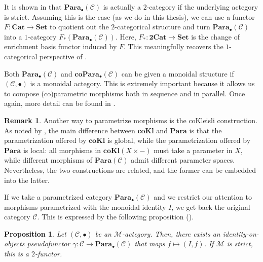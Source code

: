 \documentclass[11pt,a4paper,openright,twoside]{report}
\newcounter{mycounter}
\theoremstyle{plain}
\newtheorem{proposition}[mycounter]{Proposition}
\theoremstyle{definition}
\newtheorem{remark}[mycounter]{Remark}
\begin{document}
It is shown in \cite{gavranovic2024fundamental} that $\mathbf{Para}_{\bullet}(\mathcal{C})$ is actually a $2$-category if the underlying actegory is strict. Assuming this is the case (as we do in this thesis), we can use a functor $F: \mathbf{Cat} \to \mathbf{Set}$ to quotient out the $2$-categorical structure and turn $\mathbf{Para}_{\bullet}(\mathcal{C})$ into a $1$-category $F_{*}(\mathbf{Para}_{\bullet}(\mathcal{C}))$. Here, $F_{*}: \mathbf{2Cat} \to \mathbf{Set}$ is the change of enrichment basis functor induced by $F$. This meaningfully recovers the $1$-categorical perspective of \cite{fong2019backprop}.


Both $\mathbf{Para}_{\bullet}(\mathcal{C})$ and $\mathbf{coPara}_{\bullet}(\mathcal{C})$ can be given a monoidal structure if $(\mathcal{C}, \bullet)$ is a monoidal actegory. This is extremely important because it allows us to compose (co)parametric morphisms both in sequence and in parallel. Once again, more detail can be found in \cite{gavranovic2024fundamental}.


\begin{remark}
  Another way to parametrize morphisms is the coKleisli construction. As noted by \cite{gavranovic2024fundamental}, the main difference between $\mathbf{coKl}$ and $\mathbf{Para}$ is that the parametrization offered by $\mathbf{coKl}$ is global, while the parametrization offered by $\mathbf{Para}$ is local: all morphisms in $\mathbf{coKl}(X \times -)$ must take a parameter in $X$, while different morphisms of $\mathbf{Para}(\mathcal{C})$ admit different parameter spaces. Nevertheless, the two constructions are related, and the former can be embedded into the latter.
\end{remark}


If we take a parametrized category $\mathbf{Para}_\bullet(\mathcal{C})$ and we restrict our attention to morphisms parametrized with the monoidal identity $I$, we get back the original category $\mathcal{C}$. This is expressed by the following proposition (\cite{gavranovic2024fundamental}).

\begin{proposition}
  \label{prop: embeddingth}
  Let $(\mathcal{C}, \bullet)$ be an $\mathcal{M}$-actegory. Then, there exists an identity-on-objects pseudofunctor $\gamma: \mathcal{C} \to \mathbf{Para}_\bullet(\mathcal{C})$ that maps $f \mapsto (I,f)$. If $\mathcal{M}$ is strict, this is a $2$-functor.
\end{proposition}
\end{document}
